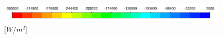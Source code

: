 \documentclass[review]{elsarticle}
\begin{document}
\begin{figure}[h!]\label{fig_cfd_heat_flux}
\centering
\includegraphics[scale = 0.45]{HEATFLUX_KEY} [$W/m^2$]\\
\hspace{5mm}

\end{figure}
\end{document}
